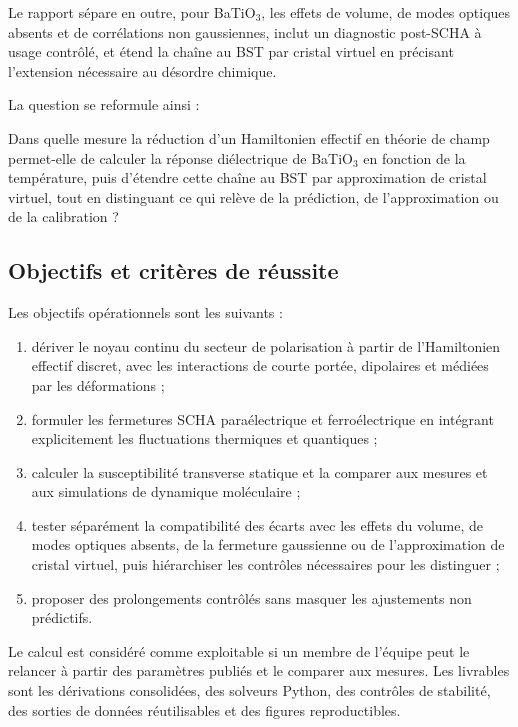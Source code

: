 \documentclass{rapportCS}
\begin{document}
Le rapport sépare en outre, pour BaTiO$_3$, les effets de volume, de
modes optiques absents et de corrélations non gaussiennes, inclut un diagnostic
post-SCHA à usage contrôlé, et étend la chaîne au BST par cristal virtuel en
précisant l'extension nécessaire au désordre chimique.

La question se reformule ainsi :

\begin{mdframed}[linecolor=red!60!black,backgroundcolor=red!2]
Dans quelle mesure la réduction d'un Hamiltonien effectif en théorie de champ
permet-elle de calculer la réponse diélectrique de BaTiO$_3$ en fonction de la
température, puis d'étendre cette chaîne au BST par approximation de cristal
virtuel, tout en distinguant ce qui relève de la prédiction, de l'approximation
ou de la calibration ?
\end{mdframed}

\subsection{Objectifs et critères de réussite}

Les objectifs opérationnels sont les suivants :

\begin{enumerate}[label=\textbf{O\arabic*.},leftmargin=2.7em]
  \item dériver le noyau continu du secteur de polarisation à partir de
  l'Hamiltonien effectif discret, avec les interactions de courte portée,
  dipolaires et médiées par les déformations ;
  \item formuler les fermetures SCHA paraélectrique et ferroélectrique en
  intégrant explicitement les fluctuations thermiques et quantiques ;
  \item calculer la susceptibilité transverse statique et la comparer aux
  mesures et aux simulations de dynamique moléculaire ;
  \item tester séparément la compatibilité des écarts avec les effets du volume,
  de modes optiques absents, de la fermeture gaussienne ou de l'approximation de
  cristal virtuel, puis hiérarchiser les contrôles nécessaires pour les
  distinguer ;
  \item proposer des prolongements contrôlés sans masquer les ajustements non
  prédictifs.
\end{enumerate}

Le calcul est considéré comme exploitable si un membre de l'équipe peut le
relancer à partir des paramètres publiés et le comparer aux mesures. Les livrables sont
les dérivations consolidées, des solveurs Python, des contrôles de stabilité, des sorties de données
réutilisables et des figures reproductibles.
\end{document}
